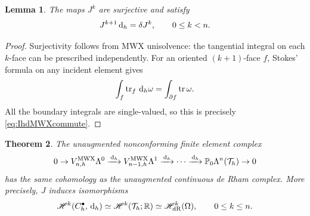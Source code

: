 \documentclass[10pt]{amsart}
\numberwithin{equation}{section}
\newtheorem{theorem}{Theorem}[section]
\newtheorem{lemma}[theorem]{Lemma}
\newcommand{\dd}{\,{\rm d}}
\newcommand{\tr}{\operatorname{tr}}
\begin{document}
\begin{lemma}
The maps $J^k$ are surjective and satisfy
\begin{equation}\label{eq:IhdMWXcommute}
J^{k+1}\dd_h=\delta J^k,\qquad 0\leq k<n.
\end{equation}
\end{lemma}
\begin{proof}
Surjectivity follows from MWX unisolvence: the tangential integral on
each $k$-face can be prescribed independently. For an oriented
$(k+1)$-face $f$, Stokes' formula on any incident element gives
\[
\int_f\tr_f\dd_h\omega=\int_{\partial f}\tr\omega.
\]
All the boundary integrals are single-valued, so this is precisely
\eqref{eq:IhdMWXcommute}.
\end{proof}

\begin{theorem}\label{thm:MWXcohomology}
The unaugmented nonconforming finite element complex
\begin{equation}\label{complex:ncfem2}
0\to V_{n,h}^{\rm MWX}\Lambda^0
\xrightarrow{\dd_h}V_{n-1,h}^{\rm MWX}\Lambda^1
\xrightarrow{\dd_h}\cdots
\xrightarrow{\dd_h}\mathbb P_0\Lambda^n(\mathcal T_h)\to0
\end{equation}
has the same cohomology as the unaugmented continuous de Rham complex.
More precisely, $J$ induces isomorphisms
\[
\mathscr H^k(C_h^\bullet,\dd_h)\simeq
\mathscr H^k(\mathcal T_h;\mathbb R)\simeq \mathscr H_{\rm dR}^k(\Omega),
\qquad 0\leq k\leq n.
\]
\end{theorem}
\end{document}
